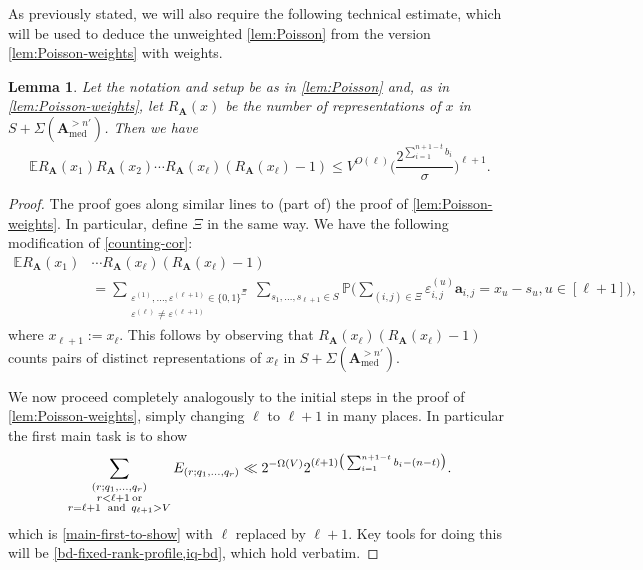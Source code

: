 \documentclass[11pt,reqno]{amsart}
\numberwithin{equation}{section}
\newtheorem{lemma}[theorem]{Lemma}
\theoremstyle{definition}
\theoremstyle{remark}
\newcommand{\mb}{\mathbb}
\newcommand{\mbf}{\mathbf}
\newcommand{\eps}{\varepsilon}
\renewcommand{\le}{\leqslant}
\def\med{\operatorname{med}}
\begin{document}
As previously stated, we will also require the following technical estimate, which will be used to deduce the unweighted \cref{lem:Poisson} from the version \cref{lem:Poisson-weights} with weights.



\begin{lemma}\label{lem:Poisson-upper} Let the notation and setup be as in \cref{lem:Poisson} and, as in \cref{lem:Poisson-weights}, let $R_{\mbf{A}}(x)$ be the number of representations of $x$ in $S + \Sigma(\mbf{A}^{> n'}_{\med})$. Then we have 
\[\mb{E} R_{\mbf{A}}(x_1)  R_{\mbf{A}}(x_2)\cdots R_{\mbf{A}}(x_{\ell})(R_{\mbf{A}}(x_\ell)-1)\le V^{O(\ell)} \Bigg(\frac{2^{\sum_{i =1}^{n + 1 - t} b_i}}{\sigma}\Bigg)^{\ell+1}.\] 
\end{lemma}
\begin{proof}
The proof goes along similar lines to (part of) the proof of \cref{lem:Poisson-weights}. In particular, define $\Xi$ in the same way. We have the following modification of \cref{counting-cor}:
\begin{align}\nonumber \mb{E} R_{\mbf{A}}(x_1) & \cdots R_{\mbf{A}}(x_{\ell})(R_{\mbf{A}}(x_{\ell}) - 1) \\ & = \sum_{\substack{\eps^{(1)}, \dots, \eps^{(\ell+1)} \in \{0,1\}^{\Xi} \\ \eps^{(\ell)} \ne \eps^{(\ell+1)}}}\sum_{s_1,\dots, s_{\ell+1} \in S} \mb{P}\Big(\sum_{(i,j) \in \Xi} \eps^{(u)}_{i,j} \mbf{a}_{i,j} = x_u - s_u, u \in  [\ell+1]\Big),\label{counting-cor-mod}\end{align} where $x_{\ell+1} := x_{\ell}$. This follows by observing that $R_{\mbf{A}}(x_{\ell}) (R_{\mbf{A}}(x_{\ell}) - 1)$ counts pairs of distinct representations of $x_{\ell}$ in $S + \Sigma(\mbf{A}^{> n'}_{\med})$.

We now proceed completely analogously to the initial steps in the proof of \cref{lem:Poisson-weights}, simply changing $\ell$ to $\ell + 1$ in many places. In particular the first main task is to show 
\begin{equation}\label{main-first-to-show-rpt} \sum_{\substack{(r; q_1,\dots, q_r) \\ r < \ell+1 \mbox{\,\scriptsize or} \\ r = \ell+1 \mbox{\, \scriptsize and \,} q_{\ell+1} > V}} E_{(r; q_1, \dots, q_r)} \ll 2^{-\Omega(V)} 2^{(\ell+1) \big(\sum_{i =1}^{n + 1 - t} b_i - (n - t) \big)}.\end{equation}
which is \cref{main-first-to-show} with $\ell$ replaced by $\ell + 1$. Key tools for doing this will be \cref{bd-fixed-rank-profile,iq-bd}, which hold verbatim.


\end{proof}
\end{document}
